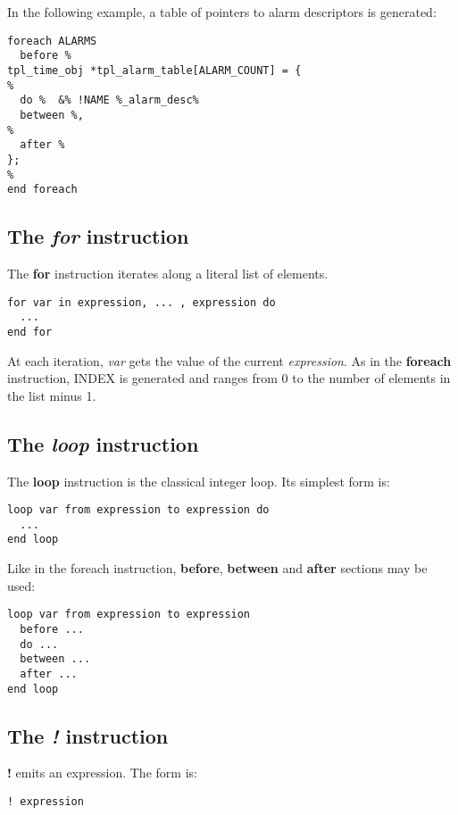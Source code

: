 In the following example, a table of pointers to alarm descriptors is generated:

\begin{lstlisting}
foreach ALARMS
  before %
tpl_time_obj *tpl_alarm_table[ALARM_COUNT] = {
%
  do %  &% !NAME %_alarm_desc%
  between %,
%
  after %
};
%
end foreach
\end{lstlisting}

\subsection{The {\em for} instruction}

The {\bf for} instruction iterates along a literal list of elements.

\begin{lstlisting}
for var in expression, ... , expression do
  ...
end for
\end{lstlisting}

At each iteration, {\em var} gets the value of the current {\em expression}. As in the {\bf foreach} instruction, INDEX is generated and ranges from 0 to the number of elements in the list minus 1.

\subsection{The {\em loop} instruction}

The {\bf loop} instruction is the classical integer loop. Its simplest form is:

\begin{lstlisting}
loop var from expression to expression do
  ...
end loop
\end{lstlisting}

Like in the foreach instruction, {\bf before},  {\bf between} and  {\bf after} sections may be used:

\begin{lstlisting}
loop var from expression to expression
  before ...
  do ...
  between ...
  after ...
end loop
\end{lstlisting}


\subsection{The {\em !} instruction}
\label{outputInstruction}

{\bf !} emits an expression. The form is:

\begin{lstlisting}
! expression
\end{lstlisting}

